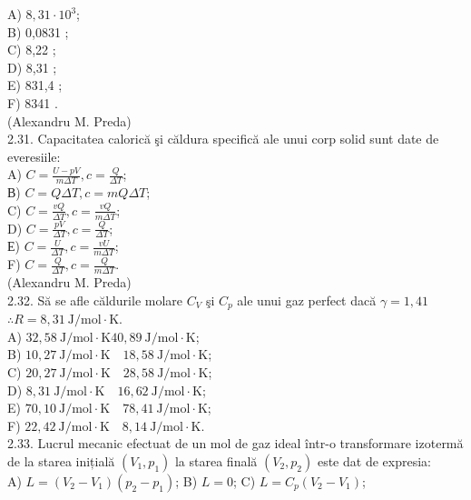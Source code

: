 A) $8,31 \cdot 10^{3}$;\\
B) 0,0831 ;\\
C) 8,22 ;\\
D) 8,31 ;\\
E) 831,4 ;\\
F) 8341 .\\
(Alexandru M. Preda)\\
2.31. Capacitatea calorică şi căldura specifică ale unui corp solid sunt date de everesiile:\\
A) $C=\frac{U-p V}{m \Delta T}, c=\frac{Q}{\Delta T}$;\\
В) $C=Q \Delta T, c=m Q \Delta T$;\\
C) $C=\frac{v Q}{\Delta T}, c=\frac{v Q}{m \Delta T}$;\\
D) $C=\frac{p V}{\Delta T}, c=\frac{Q}{\Delta T}$;\\
Е) $C=\frac{U}{\Delta T}, c=\frac{v U}{m \Delta T}$;\\
F) $C=\frac{Q}{\Delta T}, c=\frac{Q}{m \Delta T}$.\\
(Alexandru M. Preda)\\
2.32. Să se afle căldurile molare $C_{V}$ şi $C_{p}$ ale unui gaz perfect dacă $\gamma=1,41$ $\therefore R=8,31 \mathrm{~J} / \mathrm{mol} \cdot \mathrm{K}$.\\
A) $32,58 \mathrm{~J} / \mathrm{mol} \cdot \mathrm{K} 40,89 \mathrm{~J} / \mathrm{mol} \cdot \mathrm{K}$;\\
B) $10,27 \mathrm{~J} / \mathrm{mol} \cdot \mathrm{K} \quad 18,58 \mathrm{~J} / \mathrm{mol} \cdot \mathrm{K}$;\\
C) $20,27 \mathrm{~J} / \mathrm{mol} \cdot \mathrm{K} \quad 28,58 \mathrm{~J} / \mathrm{mol} \cdot \mathrm{K}$;\\
D) $8,31 \mathrm{~J} / \mathrm{mol} \cdot \mathrm{K} \quad 16,62 \mathrm{~J} / \mathrm{mol} \cdot \mathrm{K}$;\\
E) $70,10 \mathrm{~J} / \mathrm{mol} \cdot \mathrm{K} \quad 78,41 \mathrm{~J} / \mathrm{mol} \cdot \mathrm{K}$;\\
F) $22,42 \mathrm{~J} / \mathrm{mol} \cdot \mathrm{K} \quad 8,14 \mathrm{~J} / \mathrm{mol} \cdot \mathrm{K}$.\\
2.33. Lucrul mecanic efectuat de un mol de gaz ideal într-o transformare izotermă de la starea inițială $\left(V_{1}, p_{1}\right)$ la starea finală $\left(V_{2}, p_{2}\right)$ este dat de expresia:\\
A) $L=\left(V_{2}-V_{1}\right)\left(p_{2}-p_{1}\right)$; B) $L=0$; C) $L=C_{p}\left(V_{2}-V_{1}\right)$;\\

